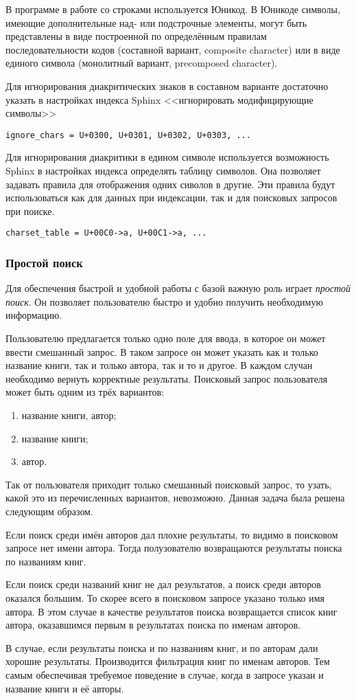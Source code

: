 В программе в работе со строками используется Юникод.
В Юникоде символы, имеющие дополнительные над- или подстрочные элементы, 
могут быть представлены в виде построенной по определённым правилам последовательности кодов (составной вариант, composite character) \cite{compositechar} 
или в виде единого символа (монолитный вариант, precomposed character).

Для игнорирования диакритических знаков в составном варианте достаточно указать в настройках индекса Sphinx <<игнорировать модифицирующие символы>>
\begin{verbatim}
ignore_chars = U+0300, U+0301, U+0302, U+0303, ...
\end{verbatim}
Для игнорирования диакритики в едином символе используется возможность Sphinx в настройках индекса определять таблицу символов. Она позволяет задавать правила для отображения одних сиволов в другие.
Эти правила будут использоваться как для данных при индексации, так и для поисковых запросов при поиске.
\begin{verbatim}
charset_table = U+00C0->a, U+00C1->a, ...
\end{verbatim}

\subsubsection{Простой поиск}

Для обеспечения быстрой и удобной работы с базой важную роль играет {\em простой поиск}.
Он позволяет пользователю быстро и удобно получить необходимую информацию.

Пользователю предлагается только одно поле для ввода, в которое он может ввести смешанный запрос.
В таком запросе он может указать как и только название книги, так и только автора, так и то и другое.
В каждом случан необходимо вернуть корректные результаты.
Поисковый запрос пользователя может быть одним из трёх вариантов:
\begin{enumerate}
	\item название книги, автор;
	\item название книги;
	\item автор.
\end{enumerate}
Так от пользователя приходит только смешанный поисковый запрос, то узать, какой это из перечисленных вариантов, невозможно.
Данная задача была решена следующим образом.

Если поиск среди имён авторов дал плохие результаты, то видимо в поисковом запросе нет имени автора. Тогда полузователю возвращаются результаты поиска по названиям книг.

Если поиск среди названий книг не дал результатов, а поиск среди авторов оказался большим. То скорее всего в поисковом запросе указано только имя автора.
В этом случае в качестве результатов поиска возвращается список книг автора, оказавшимся первым в результатах поиска по именам авторов.

В случае, если результаты поиска и по названиям книг, и по авторам дали хорошие результаты. Производится фильтрация книг по именам авторов.
Тем самым обеспечивая требуемое поведение в случае, когда в запросе указан и название книги и её авторы.






